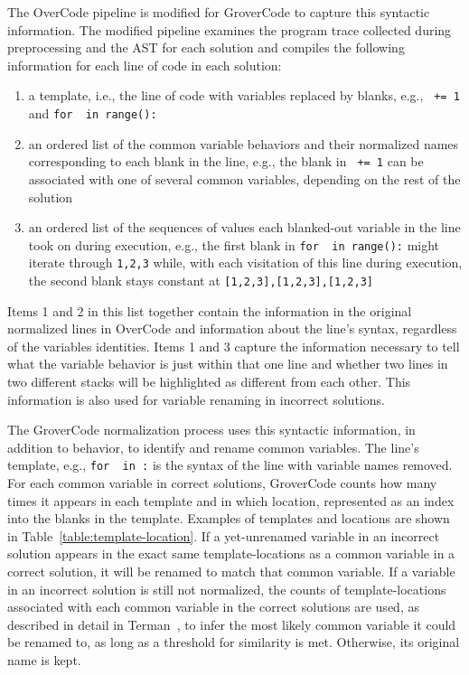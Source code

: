 The OverCode pipeline is modified for GroverCode to capture this syntactic information. The modified pipeline examines the program trace collected during preprocessing and the AST for each solution and compiles the following information for each line of code in each solution:
\begin{enumerate}
\item a template, i.e., the line of code with variables replaced by blanks, e.g., \texttt{\underline{\hspace{1em}} += 1} and \texttt{for \underline{\hspace{1em}} in range(\underline{\hspace{1em}}):}
\item an ordered list of the common variable behaviors and their normalized names corresponding to each blank in the line, e.g., the blank in \texttt{\underline{\hspace{1em}} += 1} can be associated with one of several common variables, depending on the rest of the solution
\item an ordered list of the sequences of values each blanked-out variable in the line took on during execution, e.g., the first blank in \texttt{for \underline{\hspace{1em}} in range(\underline{\hspace{1em}}):} might iterate through \texttt{1,2,3} while, with each visitation of this line during execution, the second blank stays constant at \texttt{[1,2,3],[1,2,3],[1,2,3]}
\end{enumerate}
Items 1 and 2 in this list together contain the information in the original normalized lines in OverCode and information about the line's syntax, regardless of the variables identities. Items 1 and 3 capture the information necessary to tell what the variable behavior is just within that one line and whether two lines in two different stacks will be highlighted as different from each other. This information is also used for variable renaming in incorrect solutions.

The GroverCode normalization process uses this syntactic information, in addition to behavior, to identify and rename common variables. The line's template, e.g., \texttt{for \underline{\hspace{1em}} in \underline{\hspace{1em}}:} is the syntax of the line with variable names removed. For each common variable in correct solutions, GroverCode counts how many times it appears in each template and in which location, represented as an index into the blanks in the template. Examples of templates and locations are shown in Table~\ref{table:template-location}. If a yet-unrenamed variable in an incorrect solution appears in the exact same template-locations as a common variable in a correct solution, it will be renamed to match that common variable. If a variable in an incorrect solution is still not normalized, the counts of template-locations associated with each common variable in the correct solutions are used, as described in detail in Terman~\cite{staceythesis}, to infer the most likely common variable it could be renamed to, as long as a threshold for similarity is met. Otherwise, its original name is kept.

